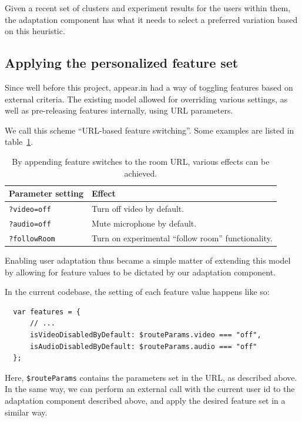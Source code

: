 Given a recent set of clusters and experiment results for the users within them, the adaptation component has what it needs to select a preferred variation based on this heuristic.

\subsection{Applying the personalized feature set} %
\label{approach:sec:applying_the_personalized_feature_set}

Since well before this project, appear.in had a way of toggling features based on external criteria. The existing model allowed for overriding various settings, as well as pre-releasing features internally, using URL parameters.

We call this scheme ``URL-based feature switching''. Some examples are listed in table~\ref{tab:feature_switches}.

\begin{table}[h]
  \centering
    \begin{tabular}{|l|l|}
      \hline
      Parameter setting    & Effect \\ \hline
      \texttt{?video=off}  & Turn off video by default. \\
      \texttt{?audio=off}  & Mute microphone by default. \\
      \texttt{?followRoom} & Turn on experimental ``follow room'' functionality. \\
      \hline
    \end{tabular}
  \caption{By appending feature switches to the room URL, various effects can be achieved.}
  \label{tab:feature_switches}
\end{table}

Enabling user adaptation thus became a simple matter of extending this model by allowing for feature values to be dictated by our adaptation component.

In the current codebase, the setting of each feature value happens like so:

\begin{verbatim}
  var features = {
      // ...
      isVideoDisabledByDefault: $routeParams.video === "off",
      isAudioDisabledByDefault: $routeParams.audio === "off"
  };
\end{verbatim}

Here, \verb|$routeParams| contains the parameters set in the URL, as described above. In the same way, we can perform an external call with the current user id to the adaptation component described above, and apply the desired feature set in a similar way.
